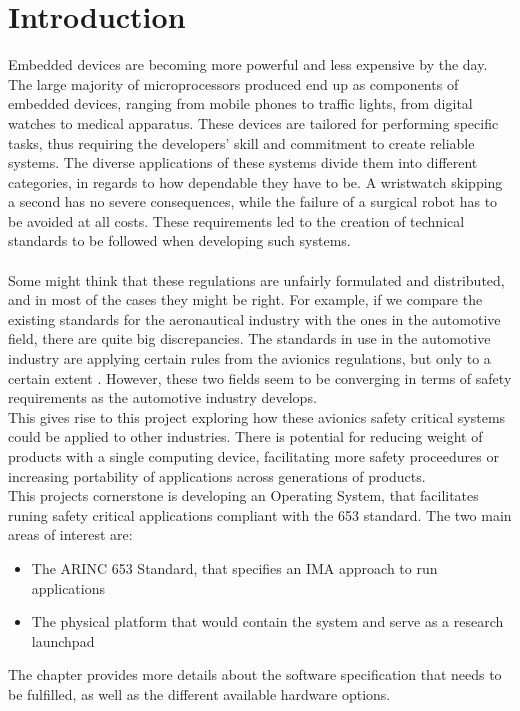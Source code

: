 \chapter{Introduction}\label{ch:introduction} 

Embedded devices are becoming more powerful and less expensive by the day. The large majority of
microprocessors produced end up as components of embedded devices, ranging from mobile phones
to traffic lights, from digital watches to medical apparatus. These devices are tailored for 
performing specific tasks, thus requiring the developers' skill and commitment to create reliable
systems. The diverse applications of these systems divide them into different categories, in regards to
how dependable they have to be. A wristwatch skipping a second has no severe consequences, while the
failure of a surgical robot has to be avoided at all costs. These requirements led to the creation 
of technical standards to be followed when developing such systems. 
\\\\
Some might think that these regulations are unfairly formulated and distributed, and in most
of the cases they might be right. For example, if we compare the existing standards for the aeronautical industry with the ones in the automotive field, there are quite big discrepancies. The standards 
in use in the automotive industry are applying certain rules from the avionics regulations, 
but only to a certain extent
\cite {can_cars_fly}.
However, these two fields seem to be converging in terms of safety requirements as the automotive industry develops.
\\
This gives rise to this project exploring how these avionics safety critical systems could be applied to other industries.
There is potential for reducing weight of products with a single computing device,
facilitating more safety proceedures
or increasing portability of applications across generations of products.
\\
This project\textquotesingle s cornerstone is developing an Operating System, that facilitates runing safety critical applications compliant with the 653 standard. 
The two main areas of interest are:
\\
\begin{itemize}
\item The ARINC 653 Standard, that specifies an IMA approach to run applications
\item The physical platform that would contain the system and serve as a research launchpad
\end{itemize}
The  chapter provides more details about the software specification that needs to be fulfilled,
as well as the different available hardware options.